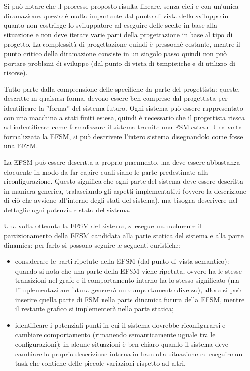 \documentclass[a4paper,titlepage]{book}
\begin{document}
Si può notare che il processo proposto risulta lineare, senza cicli e con un'unica diramazione: questo è molto importante dal punto di vista dello sviluppo in quanto non costringe lo sviluppatore ad eseguire delle scelte in base alla situazione e non deve iterare varie parti della progettazione in base al tipo di progetto. La complessità di progettazione quindi è pressochè costante, mentre il punto critico della diramazione consiste in un singolo passo quindi non può portare problemi di sviluppo (dal punto di vista di tempistiche e di utilizzo di risorse).

Tutto parte dalla comprensione delle specifiche da parte del progettista: queste, descritte in qualsiasi forma, devono essere ben comprese dal progettista per identificare la ''forma'' del sistema futuro. Ogni sistema può essere rappresentato con una macchina a stati finiti estesa, quindi è necessario che il progettista riesca ad indentificare come formalizzare il sistema tramite una FSM estesa. Una volta formalizzata la EFSM, si può descrivere l'intero sistema disegnandolo come fosse una EFSM.

La EFSM può essere descritta a proprio piacimento, ma deve essere abbastanza eloquente in modo da far capire quali siano le parte predestinate alla riconfigurazione. Questo significa che ogni parte del sistema deve essere descritta in maniera generica, tralasciando gli aspetti implementativi (ovvero la descrizione di ciò che avviene all'interno degli stati del sistema), ma bisogna descrivere nel dettaglio ogni potenziale stato del sistema. 

Una volta ottenuta la EFSM del sistema, si esegue manualmente il partizionamento della EFSM candidata alla parte statica del sistema e alla parte dinamica: per farlo si possono seguire le seguenti euristiche:

\begin{itemize}

\item considerare le parti ripetute della EFSM (dal punto di vista semantico): quando si nota che una parte della EFSM viene ripetuta, ovvero ha le stesse transizioni nel grafo e il comportamento interno ha lo stesso significato (ma l'implementazione futura genererà un comportamento diverso), allora si può inserire quella parte di FSM nella parte dinamica futura della EFSM, mentre il restante grafico si implementerà nella parte statica;

 \item identificare i potenziali punti in cui il sistema dovrebbe riconfigurarsi e cambiare comportamento (rimanendo semanticamente uguale tra le configurazioni): in alcune situazioni è ben chiaro quando il sistema deve cambiare la propria descrizione interna in base alla situazione ed eseguire un task che contiene delle piccole variazioni rispetto ad altri. 

\end{itemize}
\end{document}
